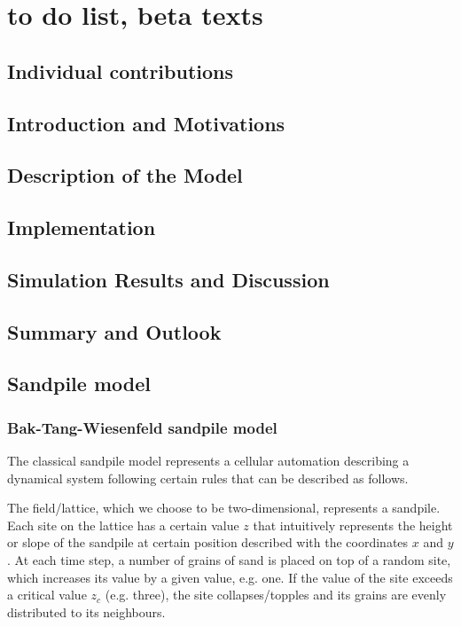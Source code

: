 \chapter{to do list, beta texts}
\thispagestyle{fancy}


\section{Individual contributions}

\section{Introduction and Motivations}

\section{Description of the Model}

\section{Implementation}

\section{Simulation Results and Discussion}

\section{Summary and Outlook}

\section{Sandpile model}

\subsection{Bak-Tang-Wiesenfeld sandpile model}

The classical sandpile model represents a cellular automation describing a dynamical system following certain rules that can be described as follows.

The field/lattice, which we choose to be two-dimensional, represents a sandpile. Each site on the lattice has a certain value $z$ that intuitively represents the height or slope of the sandpile at certain position described with the coordinates $x$ and $y$. At each time step, a number of grains of sand is placed on top of a random site, which increases its value by a given value, e.g. one. If the value of the site exceeds a critical value $z_c$ (e.g. three), the site collapses/topples and its grains are evenly distributed to its neighbours.

